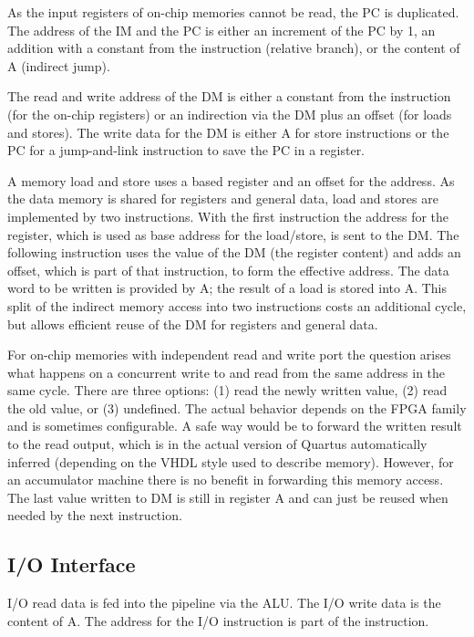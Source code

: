 \documentclass[a4paper,fontsize=10pt,twoside,DIV15,BCOR12mm,headinclude=true,footinclude=false,pagesize,bibtotoc]{scrbook}
\begin{document}
As the input registers of on-chip memories cannot be read, the PC is duplicated. The address of the IM and the PC is either an increment of the PC by 1, an addition with a constant from the instruction (relative branch), or the content of A (indirect jump).

The read and write address of the DM is either a constant from the instruction (for the on-chip registers) or an indirection via the DM plus an offset (for loads and stores). The write data for the DM is either A for store instructions or the PC for a jump-and-link instruction to save the PC in a register.

A memory load and store uses a based register and an offset for the address. As the data memory is shared for registers and general data, load and stores are implemented by two instructions. With the first instruction the address for the register, which is used as base address for the load/store, is sent to the DM. The following instruction uses the value of the DM (the register content) and adds an offset, which is part of that instruction, to form the effective address. The data word to be written is provided by A; the result of a load is stored into A. This split of the indirect memory access into two instructions costs an additional cycle, but allows efficient reuse of the DM for registers and general data.

For on-chip memories with independent read and write port the question arises what happens on a concurrent write to and read from the same address in the same cycle. There are three options: (1) read the newly written value, (2) read the old value, or (3) undefined. The actual behavior depends on the FPGA family and is sometimes configurable. A safe way would be to forward the written result to the read output, which is in the actual version of Quartus automatically inferred (depending on the VHDL style used to describe memory). However, for an accumulator machine there is no benefit in forwarding this memory access. The last value written to DM is still in register A and can just be reused when needed by the next instruction.

\subsection{I/O Interface}

I/O read data is fed into the pipeline via the ALU. The I/O write data is the content of A. The address for the I/O instruction is part of the instruction.
\end{document}
